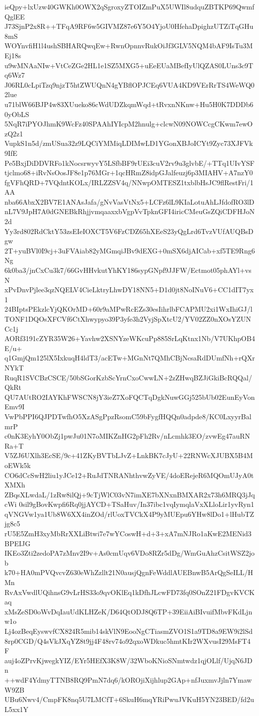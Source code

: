 ieQpy+lxUzw40GWKh0OWX2qSgroxyZTOIZmPuX5UWIl8udquZBTKP69QwmfQglEE
J73SjnP2x8R++TFqA9RF6w5GIVMZ87e6Y5O4YjoU0HfehaDpighzUTZiTqGHu8mS
WOYnvfiH1l4ushSBHARQwqEw+RwnOpnnvRukOiJf3GLV5NQM4bAF9IsTu3MEj18s
u9wMNAaNIw+VtCeZGe2HL1e1SZ5MXG5+uEeEUaMBefIyUlQZAS0LUns3c9Tq6Wz7
J06RL0cLpiTzq9njzT5htZWUQnN4gYBflOPJCEq6VUA4KD9VErRrTS4WeWQ02lue
u71blW66BJP4w83XUueko86cWdUDZkqmWqd+tRvxnNKnw+Hu5H0K7DDDb60yObLS
5NqR7iPYOJhmK9WcFz40SPAAhIYIcpM2hnulg+clcwN09NOWCcgCKwm7ewOzQ2z1
VupkS1n5d/zmUSua32z9LQCiYMMiqLDIMwLD1YGonXBJoICYt9Zyc73XJFVk9IfE
Pe5BxjDiDDVRFo1kNocsrwyvY5LSfbBF9rUEi3cuV2rv9u3glvbE/+TTq1UIvYSF
tjclmo68+iRvNsOosJF8e1p76MGr+1qcHRmZ8idpGJalfeuzj6p3MIAHV+A7nzY0
fgVFhQRD+7VQdntKOLx/IRLZZSV4q/NNwpOMTESZ1txblbHsJC9flRestFri/1AA
nba66AbxX2BV7E1ANAsJafa/gNvVasVtNx5+LCFz6lL9KIaLotuAhLJfdofRO3lD
nL7V9JpH7A0dGNEBkRhjjvmqaaxxbVgpVvTpknGFI4iricCMeuGsZQiCDFHJoN2d
Yy3rd802RdCktY53zsEIeIOXCT5V6FzCDZ65hXEeS23yQgLrd6TvzVUfAUQBsDgw
2T+yuBVl0I9cj+3uFVAiab82yMGmqiJBv9dEXG+0mSX6djAICab+xf5TE9Rng6Ng
6k0ba3/jnCxCu3k7/66GvHHvkutYhKY186sypGNpf9JJFW/Ectmot05phAYl+vsN
xPvDnvPjlee3qzNQELV4CieLktryLhwDY18NN5+D1d0jt8NoINuV6+CC1dIT7yx1
24BIptsPEkzlcYjQKOrMD+60r9aMPwRcEZs30esIihrlbFCAPMU2xi1WxIhiGJ/l
TONF1DQOsXFCVf6CtXhwypyo39P3yfe3h2VyjSpXtcU2/YV02ZZ0nXOsYZUNCc1j
AORf3191cZYR35W26+Yavhw2XSNYzeWKcuPp885SrLqKtnx1Nb/V7UKhpOB4E/u+
q1GmjQm125lX5IxkuqH4ldT3/acETw+MGnNt7QMhCBjNcsaRdDUmfNh+rQXrNYkT
RuqR1SVCBzCSCE/50bSGorKzbScYrnCxoCwwLN+2zZHwqBZJiGkiBcRQQal/QkRt
QU7AUtRO2IAYKhFWSCN8jY3ieZ7XoFQCTqDgkNuwGGj525bUb02EunEyVonEmv9I
VwPbPPI6QJPDTwfhO5XzASgPpzRsomC59bFygfHQQn0adpde8/KC0LxyyrBalmrP
c0nK3EyhY0ObZj1pwJu01N7oMIKZnHG2pFh2Rv/nLcmhk3EO/zvwEg47auRNRa+T
V5ZJ6UXlh3EcSE/9c+41ZKyBVTbLJvZ+LnkBK7cJyU+22RNWcXJUBX5B4MoEWk5k
CO6dCcSwH2liu1yJCe12+RuJdTNRANhthvwZyVE/4doERejeR6MQOmUJyA0tXMXh
ZBqsXLwdaL/1zRw8ilQj+9cTjWlC03vN7imXE7bXNxnBMXAR2x73h6MRQ3jJqcWi
0sil9gBovKwpfi6Rq0jjAYCD+TSaHuv/In37ibc1vqIymqlaVxXLloLir1yvRyn1
qVNGVw1ya1Ub8W6XX4inZOd/rlUoxTVCkX4P9yMUEpu6YHw8lDo1+lHubTZjg8c5
rU5E5ZmH3xyMbRrXXLiBtwi7e7wYCoswH+d+3+xA7mNJRo1aKwE2MENid3BPEIJG
IKEo3Zti2zedoPA7zMnv2I9v+As0cmUqv6VDo8RZr5dDg/WmGuAhzCsitWSZ2job
k70+HA0mPVQvcvZ630eWhZzllt21N0ausjQgnFeWddlAUEBnwB5ArQgSeILL/HMn
RvAxVwdlUQihnsG9vLrHS33o9qvOKlEq1kDfhJLcwFD73fq0SOnZ21FDgvKVCKaq
xMsZeSD0oWvDqIauUdKLHZeK/D64QtODJ8Q6TP+39EiiAiBIvuifMbvFKdLjnw1o
Lj4ozBeqEyswvfCX824R5mib14skVlN9EooNgCTiasmZVO1S1a9TD8a9EW9i2lSd
8rp0CGD/Q4sVkJXqYZ8t9jj4F48rv74o92qxoWDkuc5hmtKIr2WXvusI29MsFT4F
auj4oZPrvKjwegkYIZ/EYr5HEfX3K8W/32WboKNioSNmtwdz1qjOLlf/UjqN6JDn
++wdF4YdmyTTNB8RQ9PmN7dq6/kOROjiXijhlup2GAp+nfJuxmvJjln7YmawW9ZB
UBu6Nwv4/CmpFK8nq5U7LMCfT+6SkuH6mqYRiPwuJVKuH5YN23BED/fd2uL5xx1Y
